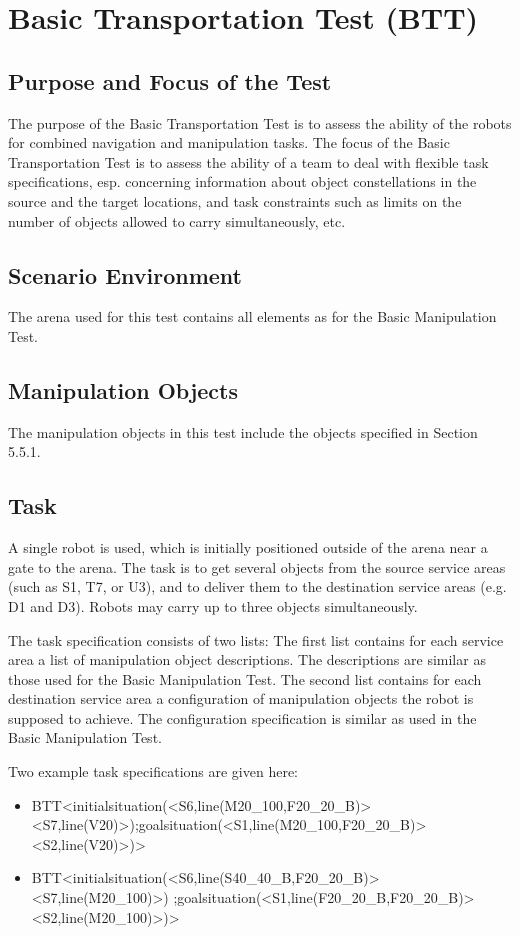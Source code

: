 \section{Basic Transportation Test (BTT)}

\subsection{Purpose and Focus of the Test}
The purpose of the Basic Transportation Test is to assess the ability of the robots for combined navigation and manipulation tasks. 
The focus of the Basic Transportation Test is to assess the ability of a team to deal with flexible task specifications, esp. concerning information about object constellations in the source and the target locations, and task constraints such as limits on the number of objects allowed to carry simultaneously, etc.  

\subsection{Scenario Environment}
The arena used for this test contains all elements as for the Basic Manipulation Test. 

\subsection{Manipulation Objects}
The manipulation objects in this test include the objects specified in Section 5.5.1.

\subsection{Task}
A single robot is used, which is initially positioned outside of the arena near a gate to the arena. The task is to get several objects from the source service areas (such as S1, T7, or U3), and to deliver them to the destination service areas (e.g. D1 and D3). Robots may carry up to three objects simultaneously. 
\par
The task specification consists of two lists:
The first list contains for each service area a list of manipulation object descriptions. The descriptions are similar as those used for the Basic Manipulation Test. 
The second list contains for each destination service area a configuration of manipulation objects the robot is supposed to achieve. The configuration specification is similar as used in the Basic Manipulation Test. 

Two example task specifications are given here:
\begin{itemize}
\item BTT\textless initialsituation(\textless S6,line(M20\_100,F20\_20\_B)\textgreater \textless S7,line(V20)\textgreater);goalsituation(\textless S1,line(M20\_100,F20\_20\_B)\textgreater \textless S2,line(V20)\textgreater )\textgreater
\item  BTT\textless initialsituation(\textless S6,line(S40\_40\_B,F20\_20\_B)\textgreater \textless S7,line(M20\_100)\textgreater) ;goalsituation(\textless S1,line(F20\_20\_B,F20\_20\_B)>\textless S2,line(M20\_100)\textgreater )\textgreater

\end{itemize}

